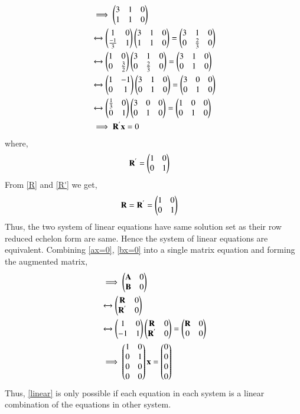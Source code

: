\documentclass[journal,12pt,twocolumn]{IEEEtran}
\begin{document}
\begin{align}
    &\implies \begin{pmatrix}3&1&0\\1&1&0\end{pmatrix} \\
    &\xleftrightarrow{}\begin{pmatrix}1&0\\\frac{-1}{3}&1\end{pmatrix}\begin{pmatrix}3&1&0\\1&1&0\end{pmatrix} = \begin{pmatrix}3&1&0\\0&\frac{2}{3}&0\end{pmatrix} \\
    &\xleftrightarrow{}\begin{pmatrix}1&0\\0&\frac{3}{2}\end{pmatrix}\begin{pmatrix}3&1&0\\0&\frac{2}{3}&0\end{pmatrix} = \begin{pmatrix}3&1&0\\0&1&0\end{pmatrix}\\
    &\xleftrightarrow{}\begin{pmatrix}1&-1\\0&1\end{pmatrix}\begin{pmatrix}3&1&0\\0&1&0\end{pmatrix} = \begin{pmatrix}3&0&0\\0&1&0\end{pmatrix}\\
    &\xleftrightarrow{}\begin{pmatrix}\frac{1}{3}&0\\0&1\end{pmatrix}\begin{pmatrix}3&0&0\\0&1&0\end{pmatrix} = \begin{pmatrix}1&0&0\\0&1&0\end{pmatrix} \\
    &\implies\mathbf{R}^{'}\mathbf{x} = 0
\end{align}
where, 
\begin{align}
    \mathbf{R}^{'}&= \begin{pmatrix}1&0\\0&1\end{pmatrix} \label{R'}
\end{align}
From \eqref{R} and \eqref{R'} we get, 
\begin{align}
    \mathbf{R}&=\mathbf{R}^{'}=\begin{pmatrix}1&0\\0&1\end{pmatrix}
\end{align}
Thus, the two system of linear equations have same solution set as their row reduced echelon form are same. Hence the system of linear equations are equivalent. 
Combining \eqref{ax=0}, \eqref{bx=0} into a single matrix equation and forming the augmented matrix, 
\begin{align}
    &\implies\begin{pmatrix}\mathbf{A}&0\\ \mathbf{B}&0\end{pmatrix} \\
    &\xleftrightarrow{}\begin{pmatrix}\mathbf{R}&0\\ \mathbf{R}^{'}&0\end{pmatrix} \\
    &\xleftrightarrow{}\begin{pmatrix}1&0\\-1&1\end{pmatrix}\begin{pmatrix}\mathbf{R}&0\\ \mathbf{R}^{'}&0\end{pmatrix} = \begin{pmatrix}\mathbf{R}&0\\ 0&0\end{pmatrix} \\
    &\implies\begin{pmatrix}1&0\\0&1\\0&0\\0&0\end{pmatrix}\mathbf{x}= \begin{pmatrix}0\\0\\0\\0\end{pmatrix} \label{linear}
\end{align}
Thus, \eqref{linear} is only possible if each equation in each system is a linear combination of the equations in other system.
\end{document}
